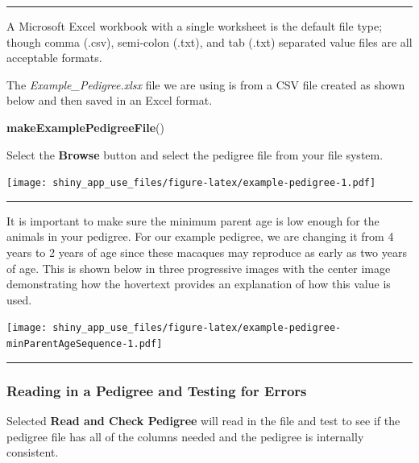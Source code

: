 \documentclass[
]{article}
\newenvironment{Shaded}{\begin{snugshade}}{\end{snugshade}}
\newcommand{\KeywordTok}[1]{\textcolor[rgb]{0.13,0.29,0.53}{\textbf{#1}}}
\newcommand{\NormalTok}[1]{#1}
\begin{document}
\begin{center}\rule{0.5\linewidth}{\linethickness}\end{center}

A Microsoft Excel workbook with a single worksheet is the default file
type; though comma (.csv), semi-colon (.txt), and tab (.txt) separated
value files are all acceptable formats.

The \emph{Example\_Pedigree.xlsx} file we are using is from a CSV file
created as shown below and then saved in an Excel format.

\begin{Shaded}
\begin{Highlighting}[]
\KeywordTok{makeExamplePedigreeFile}\NormalTok{()}
\end{Highlighting}
\end{Shaded}

Select the \textbf{Browse} button and select the pedigree file from your
file system.

\texttt{[image: shiny\_app\_use\_files/figure-latex/example-pedigree-1.pdf]}

\begin{center}\rule{0.5\linewidth}{\linethickness}\end{center}

It is important to make sure the minimum parent age is low enough for
the animals in your pedigree. For our example pedigree, we are changing
it from 4 years to 2 years of age since these macaques may reproduce as
early as two years of age. This is shown below in three progressive
images with the center image demonstrating how the hovertext provides an
explanation of how this value is used.

\texttt{[image: shiny\_app\_use\_files/figure-latex/example-pedigree-minParentAgeSequence-1.pdf]}

\begin{center}\rule{0.5\linewidth}{\linethickness}\end{center}

\hypertarget{reading-in-a-pedigree-and-testing-for-errors}{%
\subsubsection{Reading in a Pedigree and Testing for
Errors}\label{reading-in-a-pedigree-and-testing-for-errors}}

Selected \textbf{Read and Check Pedigree} will read in the file and test
to see if the pedigree file has all of the columns needed and the
pedigree is internally consistent.
\end{document}
